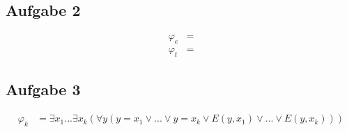 \documentclass[a4paper,10pt]{article}
\begin{document}
\subsection*{Aufgabe 2}
\begin{align*}
	\varphi_e &= \\ 
	\varphi_t &= 
\end{align*}

\subsection*{Aufgabe 3}
\begin{align*}
	\varphi_k &= \exists x_1...\exists x_k(\forall y(y = x_1 \lor ... \lor y = x_k \lor E(y,x_1) \lor ... \lor E(y,x_k)))
\end{align*}
\end{document}
